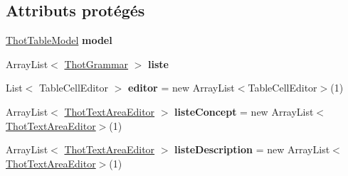 \subsection*{Attributs protégés}
\begin{DoxyCompactItemize}
\item 
\mbox{\label{classfr_1_1irit_1_1elipse_1_1project_1_1_thot_table_a4b7ec8d6e94ff0e26d7c1a62c4d66a74}} 
\mbox{\hyperlink{classfr_1_1irit_1_1elipse_1_1project_1_1_thot_table_model}{Thot\+Table\+Model}} {\bfseries model}
\item 
\mbox{\label{classfr_1_1irit_1_1elipse_1_1project_1_1_thot_table_a5c37d7206b6b7052bb306d23f1ae0729}} 
Array\+List$<$ \mbox{\hyperlink{classfr_1_1irit_1_1elipse_1_1project_1_1_thot_grammar}{Thot\+Grammar}} $>$ {\bfseries liste}
\item 
\mbox{\label{classfr_1_1irit_1_1elipse_1_1project_1_1_thot_table_a0d1ae35c920f86fb0f2c7fa6b0157d69}} 
List$<$ Table\+Cell\+Editor $>$ {\bfseries editor} = new Array\+List$<$Table\+Cell\+Editor$>$(1)
\item 
\mbox{\label{classfr_1_1irit_1_1elipse_1_1project_1_1_thot_table_a048af3959d3a02a668138d4147f55eec}} 
Array\+List$<$ \mbox{\hyperlink{classfr_1_1irit_1_1elipse_1_1project_1_1_thot_text_area_editor}{Thot\+Text\+Area\+Editor}} $>$ {\bfseries liste\+Concept} = new Array\+List$<$\mbox{\hyperlink{classfr_1_1irit_1_1elipse_1_1project_1_1_thot_text_area_editor}{Thot\+Text\+Area\+Editor}}$>$(1)
\item 
\mbox{\label{classfr_1_1irit_1_1elipse_1_1project_1_1_thot_table_a37e9836048ecf91e2efa6bca159076a7}} 
Array\+List$<$ \mbox{\hyperlink{classfr_1_1irit_1_1elipse_1_1project_1_1_thot_text_area_editor}{Thot\+Text\+Area\+Editor}} $>$ {\bfseries liste\+Description} = new Array\+List$<$\mbox{\hyperlink{classfr_1_1irit_1_1elipse_1_1project_1_1_thot_text_area_editor}{Thot\+Text\+Area\+Editor}}$>$(1)
\item 
\mbox{\label{classfr_1_1irit_1_1elipse_1_1project_1_1_thot_table_a62203bf840fad0e5bc3a0465e1504417}} 

\end{DoxyCompactItemize}
